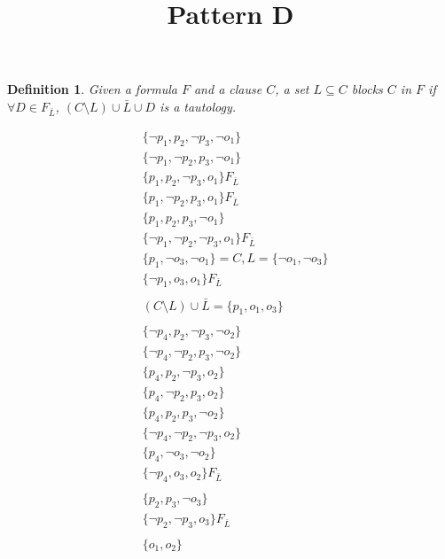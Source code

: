 \documentclass[a4paper,16pt]{article}
\title{Pattern D}
\author{}
\newtheorem{definition}{Definition}
\begin{document}
\begin{definition}
Given a formula $F$ and a clause $C$, a set $L \subseteq C$ blocks $C$ in $F$ if $\forall D \in F_{\bar L}$, $(C \setminus L) \cup \bar L \cup D$ is a tautology.
\end{definition}

\begin{align*}
& \{ \neg p_1, p_2, \neg p_3, \neg o_1 \} \\
& \{ \neg p_1, \neg p_2, p_3, \neg o_1 \} \\
& \{ p_1, p_2, \neg p_3, o_1 \} F_{\bar L}\\
& \{ p_1, \neg p_2, p_3, o_1 \} F_{\bar L} \\
& \{ p_1, p_2, p_3, \neg o_1 \} \\
& \{ \neg p_1, \neg p_2, \neg p_3, o_1 \} F_{\bar L} \\
& \{ p_1, \neg o_3, \neg o_1 \} = C, L = \{\neg o_1, \neg o_3\}\\
& \{ \neg p_1, o_3, o_1 \} F_{\bar L} \\
\\
& (C \setminus L) \cup \bar L = \{p_1, o_1, o_3\} \\
\\
& \{ \neg p_4, p_2, \neg p_3, \neg o_2 \} \\
& \{ \neg p_4, \neg p_2, p_3, \neg o_2 \} \\
& \{ p_4, p_2, \neg p_3, o_2 \} \\
& \{ p_4, \neg p_2, p_3, o_2 \} \\
& \{ p_4, p_2, p_3, \neg o_2 \} \\
& \{ \neg p_4, \neg p_2, \neg p_3, o_2 \} \\
& \{ p_4, \neg o_3, \neg o_2 \} \\
& \{ \neg p_4, o_3, o_2  \} F_{\bar L} \\
\\
& \{ p_2, p_3, \neg o_3 \} \\
& \{ \neg p_2, \neg p_3, o_3 \} F_{\bar L} \\
\\
& \{ o_1, o_2 \} \\
\end{align*}
\end{document}
